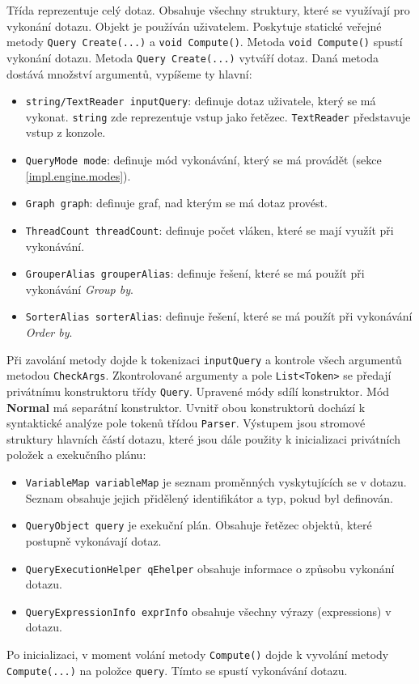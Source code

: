 Třída reprezentuje celý dotaz.
Obsahuje všechny struktury, které se využívají pro vykonání dotazu.
Objekt je používán uživatelem.
Poskytuje statické veřejné metody \texttt{Query Create(...)} a \texttt{void Compute()}.
Metoda \texttt{void Compute()} spustí vykonání dotazu.
Metoda \texttt{Query Create(...)} vytváří dotaz.
Daná metoda dostává množství argumentů, vypíšeme ty hlavní:
\begin{itemize}
\item \texttt{string/TextReader inputQuery}: definuje dotaz uživatele, který se má vykonat. \texttt{string} zde reprezentuje vstup jako řetězec. \texttt{TextReader} představuje vstup z konzole.
\item \texttt{QueryMode mode}: definuje mód vykonávání, který se má provádět (sekce \ref{impl.engine.modes}).
\item \texttt{Graph graph}: definuje graf, nad kterým se má dotaz provést.
\item \texttt{ThreadCount threadCount}: definuje počet vláken, které se mají využít při vykonávání.
\item \texttt{GrouperAlias grouperAlias}: definuje řešení, které se má použít při vykonávání \textit{Group by}.
\item \texttt{SorterAlias sorterAlias}: definuje řešení, které se má použít při vykonávání \textit{Order by}.
\end{itemize}
Při zavolání metody dojde k tokenizaci \texttt{inputQuery} a kontrole všech argumentů metodou \texttt{CheckArgs}.
Zkontrolované argumenty a pole \texttt{List<Token>} se předají privátnímu konstruktoru třídy \texttt{Query}.
Upravené módy sdílí konstruktor. Mód \textbf{Normal} má separátní konstruktor.
Uvnitř obou konstruktorů dochází k syntaktické analýze pole tokenů třídou \texttt{Parser}.
Výstupem jsou stromové struktury hlavních částí dotazu, které jsou dále použity k inicializaci privátních položek a exekučního plánu:
\begin{itemize}
\item \texttt{VariableMap variableMap} je seznam proměnných vyskytujících se v dotazu. Seznam obsahuje jejich přidělený identifikátor a typ, pokud byl definován.
\item \texttt{QueryObject query} je exekuční plán. Obsahuje řetězec objektů, které postupně vykonávají dotaz.
\item \texttt{QueryExecutionHelper qEhelper} obsahuje informace o způsobu vykonání dotazu. 
\item \texttt{QueryExpressionInfo exprInfo} obsahuje všechny výrazy (expressions) v dotazu.
\end{itemize}
Po inicializaci, v moment volání metody \texttt{Compute()} dojde k vyvolání metody \texttt{Compute(...)} na položce \texttt{query}.
Tímto se spustí vykonávání dotazu.

